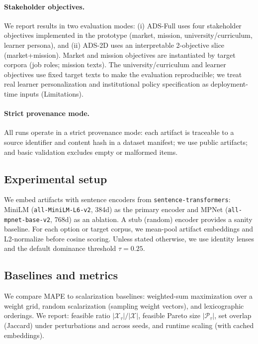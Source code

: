 \documentclass[sigconf,review]{acmart}
\newcommand{\MAPE}{\textsc{MAPE}\xspace}
\begin{document}
\paragraph{Stakeholder objectives.}
We report results in two evaluation modes:
(i) {ADS-Full} uses four stakeholder objectives implemented in the prototype (market, mission, university/curriculum, learner persona), and
(ii) {ADS-2D} uses an interpretable 2-objective slice (market+mission).
Market and mission objectives are instantiated by target corpora (job roles; mission texts). The university/curriculum and learner objectives use fixed target texts to make the evaluation reproducible; we treat real learner personalization and institutional policy specification as deployment-time inputs (Limitations).

\paragraph{Strict provenance mode.}
All runs operate in a strict provenance mode: each artifact is traceable to a source identifier and content hash in a dataset manifest; we use public artifacts; and basic validation excludes empty or malformed items.



\subsection{Experimental setup}
We embed artifacts with sentence encoders from \texttt{sentence-transformers}: MiniLM (\texttt{all-MiniLM-L6-v2}, 384d) as the primary encoder and MPNet (\texttt{all-mpnet-base-v2}, 768d) as an ablation. A stub (random) encoder provides a sanity baseline. For each option or target corpus, we mean-pool artifact embeddings and L2-normalize before cosine scoring. Unless stated otherwise, we use identity lenses and the default dominance threshold $\tau{=}0.25$.

\subsection{Baselines and metrics}
We compare \MAPE to scalarization baselines: weighted-sum maximization over a weight grid, random scalarization (sampling weight vectors), and lexicographic orderings. We report: feasible ratio $|\mathcal{X}_\tau|/|\mathcal{X}|$, feasible Pareto size $|\mathcal{P}_\tau|$, set overlap (Jaccard) under perturbations and across seeds, and runtime scaling (with cached embeddings).
\end{document}

